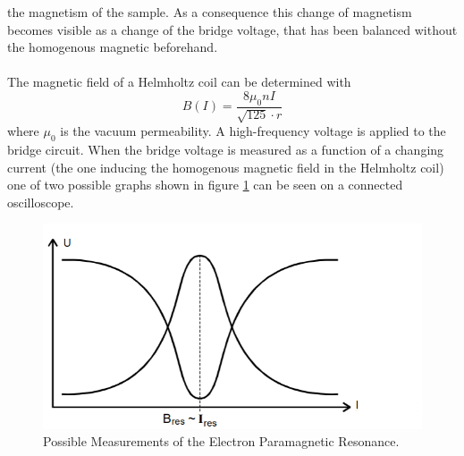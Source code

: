 the magnetism of the sample. As a consequence this change of magnetism becomes visible as a change of the bridge voltage, that has been balanced without the homogenous magnetic beforehand. \\ \\ \noindent
The magnetic field of a Helmholtz coil can be determined with
\begin{equation}
  B(I)=\frac{8\mu_0 n I}{\sqrt{125}\cdot r}
  \label{eq:mfield}
\end{equation}
where $\mu_0$ is the vacuum permeability. A high-frequency voltage is applied to the bridge circuit.
When the bridge voltage is measured as a function of a changing current (the one inducing the homogenous magnetic field in the Helmholtz coil) one of two possible graphs shown in figure \ref{two}
can be seen on a connected oscilloscope.
\begin{figure}[H]
  \centering
  \includegraphics[scale=0.75]{two.png}
  \caption{Possible Measurements of the Electron Paramagnetic Resonance. \cite{1}} \label{two}
\end{figure}

